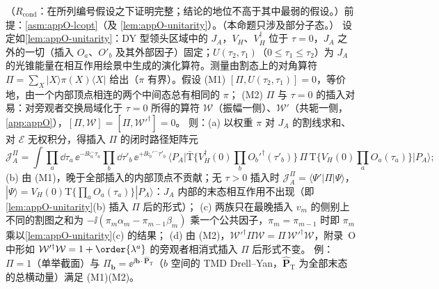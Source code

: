 \begin{proposition}\label{prop:break-measurement}
（$R_{\mathrm{cond}}$：在所列编号假设之下证明完整；结论的地位不高于其中最弱的假设。）前提：\cref{asm:appO-lcopt}（及 \cref{lem:appO-unitarity}）。（本命题只涉及部分子态。）
设定如\cref{lem:appO-unitarity}：DY 型领头区域中的 $J_A$，$V_H$、$V_H^\dagger$ 位于 $\tau=0$，$J_A$ 之外的一切（插入 $O_a$、$O'_b$ 及其外部因子）固定；$U(\tau_2,\tau_1)$（$0\le\tau_1\le\tau_2$）为 $J_A$ 的光锥能量在相互作用绘景中生成的演化算符。测量由割态上的对角算符 $\Pi=\sum_X|X\rangle\pi(X)\langle X|$ 给出（$\pi$ 有界）。假设
(M1) $[\Pi,U(\tau_2,\tau_1)]=0$，等价地，由一个内部顶点相连的两个中间态总有相同的 $\pi$；
(M2) $\Pi$ 与 $\tau=0$ 的插入对易：对旁观者交换局域化于 $\tau=0$ 所得的算符 $\mathcal W$（振幅一侧）、$\mathcal W'$（共轭一侧，\cref{app:appO}），$[\Pi,\mathcal W]=[\Pi,\mathcal W'^\dagger]=0$。
则：(a) 以权重 $\pi$ 对 $J_A$ 的割线求和、对 $\mathcal E$ 无权积分，得插入 $\Pi$ 的闭时路径矩阵元
\begin{equation}\label{eq:break-ctp-Pi}
\mathcal J_A^{\Pi}=\int\prod_a\dd\tau_a\,\ee^{-\ii k_a^-\tau_a}\prod_b\dd\tau'_b\,\ee^{+\ii k_b'^-\tau'_b}\,
\big\langle P_A\big|\bar{\mathrm T}\big\{V_H^\dagger(0)\textstyle\prod_bO_b'^\dagger(\tau'_b)\big\}\,\Pi\,\mathrm T\big\{V_H(0)\prod_aO_a(\tau_a)\big\}\big|P_A\big\rangle ;
\end{equation}
(b) 由 (M1)，晚于全部插入的内部顶点不贡献；无 $\tau>0$ 插入时 $\mathcal J_A^{\Pi}=\langle\Psi'|\Pi|\Psi\rangle$，$|\Psi\rangle=V_H(0)\mathrm T\{\prod_aO_a(\tau_a)\}|P_A\rangle$：$J_A$ 内部的末态相互作用不出现（即\cref{lem:appO-unitarity}(b) 插入 $\Pi$ 后的形式）；
(c) 两族只在最晚插入 $v_m$ 的侧别上不同的割图之和为 $-\ii(\pi_m\alpha_m-\pi_{m-1}\beta_m)$ 乘一个公共因子，$\pi_m=\pi_{m-1}$ 时即 $\pi_m$ 乘以\cref{lem:appO-unitarity}(c) 的结果；
(d) 由 (M2)，$\mathcal W'^\dagger\Pi\mathcal W=\Pi\,\mathcal W'^\dagger\mathcal W$，附录~O 中形如 $\mathcal W'^\dagger\mathcal W=1+\order{\lambda^a}$ 的旁观者相消式插入 $\Pi$ 后形式不变。
例：$\Pi=1$（单举截面）与 $\Pi_{\boldsymbol b}=\ee^{\ii\boldsymbol b\cdot\hat{\boldsymbol P}_{\mathrm T}}$（$b$ 空间的 TMD Drell--Yan，$\hat{\boldsymbol P}_{\mathrm T}$ 为全部末态的总横动量）满足 (M1)(M2)。
\end{proposition}

